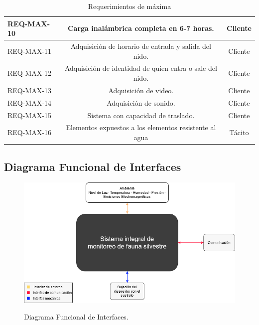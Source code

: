 \begin{table}[]
\begin{tabular}{|l|c|c|}
REQ-MAX-10                        & Carga inalámbrica completa en 6-7 horas.                                                                                             & Cliente         \\ \hline
REQ-MAX-11                        & Adquisición de horario de entrada y salida del nido.                                                                                 & Cliente         \\ \hline
REQ-MAX-12                        & Adquisición de identidad de quien entra o sale del nido.                                                                             & Cliente         \\ \hline
REQ-MAX-13                        & Adquisición de video.                                                                                                                & Cliente         \\ \hline
REQ-MAX-14                        & Adquisición de sonido.                                                                                                               & Cliente         \\ \hline
REQ-MAX-15                        & Sistema con capacidad de traslado.                                                                                                   & Cliente         \\ \hline
REQ-MAX-16                        & Elementos expuestos a los elementos resistente al agua                                                                               & Tácito          \\ \hline
\end{tabular}
\label{tab:req_max}
\caption{Requerimientos de máxima}
\end{table}




\subsection{Diagrama Funcional de Interfaces}

\begin{figure}[H]
	\centering
	\includegraphics[width=\linewidth]{ImagenesDefinicion/func}
	\label{fig:diagrama_func_interfaces}
	\caption{Diagrama Funcional de Interfaces.}
\end{figure}

